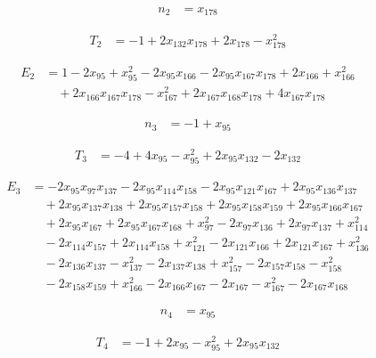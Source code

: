 \begin{align*}
n_{2}&=x_{178}
\end{align*}

\begin{align*}
T_{2}&=-1+2x_{132}x_{178}+2x_{178}-x_{178}^{2}
\end{align*}

\begin{align*}
E_{2}&=1-2x_{95}+x_{95}^{2}-2x_{95}x_{166}-2x_{95}x_{167}x_{178}+2x_{166}+x_{166}^{2}\\
&\quad +2x_{166}x_{167}x_{178}-x_{167}^{2}+2x_{167}x_{168}x_{178}+4x_{167}x_{178}
\end{align*}

\begin{align*}
n_{3}&=-1+x_{95}
\end{align*}

\begin{align*}
T_{3}&=-4+4x_{95}-x_{95}^{2}+2x_{95}x_{132}-2x_{132}
\end{align*}

\begin{align*}
E_{3}&=-2x_{95}x_{97}x_{137}-2x_{95}x_{114}x_{158}-2x_{95}x_{121}x_{167}+2x_{95}x_{136}x_{137}\\
&\quad +2x_{95}x_{137}x_{138}+2x_{95}x_{157}x_{158}+2x_{95}x_{158}x_{159}+2x_{95}x_{166}x_{167}\\
&\quad +2x_{95}x_{167}+2x_{95}x_{167}x_{168}+x_{97}^{2}-2x_{97}x_{136}+2x_{97}x_{137}+x_{114}^{2}\\
&\quad -2x_{114}x_{157}+2x_{114}x_{158}+x_{121}^{2}-2x_{121}x_{166}+2x_{121}x_{167}+x_{136}^{2}\\
&\quad -2x_{136}x_{137}-x_{137}^{2}-2x_{137}x_{138}+x_{157}^{2}-2x_{157}x_{158}-x_{158}^{2}\\
&\quad -2x_{158}x_{159}+x_{166}^{2}-2x_{166}x_{167}-2x_{167}-x_{167}^{2}-2x_{167}x_{168}
\end{align*}

\begin{align*}
n_{4}&=x_{95}
\end{align*}

\begin{align*}
T_{4}&=-1+2x_{95}-x_{95}^{2}+2x_{95}x_{132}
\end{align*}


